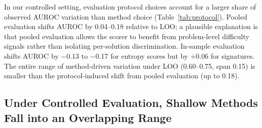 \documentclass{article}
\begin{document}
In our controlled setting, evaluation protocol choices account for a larger share of observed AUROC variation than method choice (Table~\ref{tab:protocol}). Pooled evaluation shifts AUROC by 0.04--0.18 relative to LOO; a plausible explanation is that pooled evaluation allows the scorer to benefit from problem-level difficulty signals rather than isolating per-solution discrimination. In-sample evaluation shifts AUROC by $-$0.13 to $-$0.17 for entropy scores but by $+$0.06 for signatures. The entire range of method-driven variation under LOO (0.60--0.75, span 0.15) is smaller than the protocol-induced shift from pooled evaluation (up to 0.18).

\subsection{Under Controlled Evaluation, Shallow Methods Fall into an Overlapping Range}
\label{sec:band}

\begin{table}[t]
\centering
\caption{LOO results on hard problems (DA and fixed-direction AUROC) with 95\% bootstrap CIs.}
\label{tab:ceiling}
\end{table}
\end{document}

